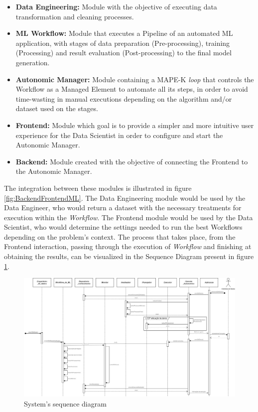 \documentclass[runningheads]{llncs}
\begin{document}
\begin{itemize}
    \item {\textbf{Data Engineering:}} Module with the objective of executing data transformation and cleaning processes.
	\item {\textbf{ML Workflow:}} Module that executes a Pipeline of an automated ML application, with stages of data preparation (Pre-processing), training (Processing) and result evaluation (Post-processing) to the final model generation.
     \item {\textbf{Autonomic Manager:}} Module containing a MAPE-K \textit{loop} that controls the Workflow as a Managed Element to automate all its steps, in order to avoid time-wasting in manual executions depending on the algorithm and/or dataset used on the stages.
     \item {\textbf{Frontend:}} Module which goal is to provide a simpler and more intuitive user experience for the Data Scientist in order to configure and start the Autonomic Manager.
	\item {\textbf{Backend:}} Module created with the objective of connecting the Frontend to the Autonomic Manager.
\end{itemize}

The integration between these modules is illustrated in figure \ref{fig:BackendFrontendML}. The Data Engineering module would be used by the Data Engineer, who would return a dataset with the necessary treatments for execution within the \textit{Workflow}. The Frontend module would be used by the Data Scientist, who would determine the settings needed to run the best Workflows depending on the problem's context. The process that takes place, from the Frontend interaction, passing through the execution of \textit{Workflow} and finishing at obtaining the results, can be visualized in the Sequence Diagram present in figure \ref{fig:DiagramaSequencia}.

\begin{figure}[h]
\centering
\includegraphics[scale=0.3]{images/Diagrama_Sequencia.jpg}
\caption {System's sequence diagram}
\label{fig:DiagramaSequencia}
\end{figure}
\end{document}

